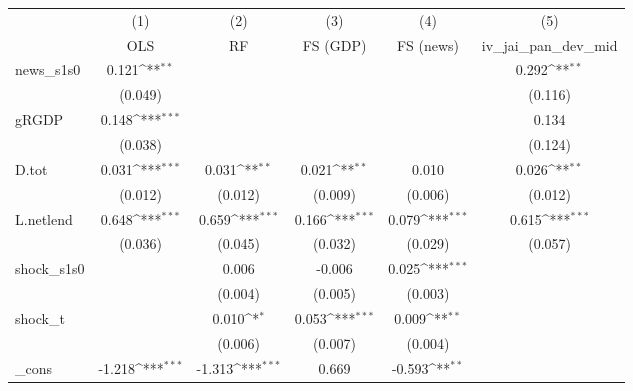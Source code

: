 {
\def\sym#1{\ifmmode^{#1}\else\(^{#1}\)\fi}
\begin{tabular}{l*{5}{c}}
\toprule
            &\multicolumn{1}{c}{(1)}&\multicolumn{1}{c}{(2)}&\multicolumn{1}{c}{(3)}&\multicolumn{1}{c}{(4)}&\multicolumn{1}{c}{(5)}\\
            &\multicolumn{1}{c}{OLS}&\multicolumn{1}{c}{RF}&\multicolumn{1}{c}{FS (GDP)}&\multicolumn{1}{c}{FS (news)}&\multicolumn{1}{c}{iv\_jai\_pan\_dev\_mid}\\
\midrule
news\_s1s0   &       0.121\sym{**} &                     &                     &                     &       0.292\sym{**} \\
            &     (0.049)         &                     &                     &                     &     (0.116)         \\
\addlinespace
gRGDP       &       0.148\sym{***}&                     &                     &                     &       0.134         \\
            &     (0.038)         &                     &                     &                     &     (0.124)         \\
\addlinespace
D.tot       &       0.031\sym{***}&       0.031\sym{**} &       0.021\sym{**} &       0.010         &       0.026\sym{**} \\
            &     (0.012)         &     (0.012)         &     (0.009)         &     (0.006)         &     (0.012)         \\
\addlinespace
L.netlend   &       0.648\sym{***}&       0.659\sym{***}&       0.166\sym{***}&       0.079\sym{***}&       0.615\sym{***}\\
            &     (0.036)         &     (0.045)         &     (0.032)         &     (0.029)         &     (0.057)         \\
\addlinespace
shock\_s1s0  &                     &       0.006         &      -0.006         &       0.025\sym{***}&                     \\
            &                     &     (0.004)         &     (0.005)         &     (0.003)         &                     \\
\addlinespace
shock\_t     &                     &       0.010\sym{*}  &       0.053\sym{***}&       0.009\sym{**} &                     \\
            &                     &     (0.006)         &     (0.007)         &     (0.004)         &                     \\
\addlinespace
\_cons      &      -1.218\sym{***}&      -1.313\sym{***}&       0.669         &      -0.593\sym{**} &                     \\

\end{tabular}}
